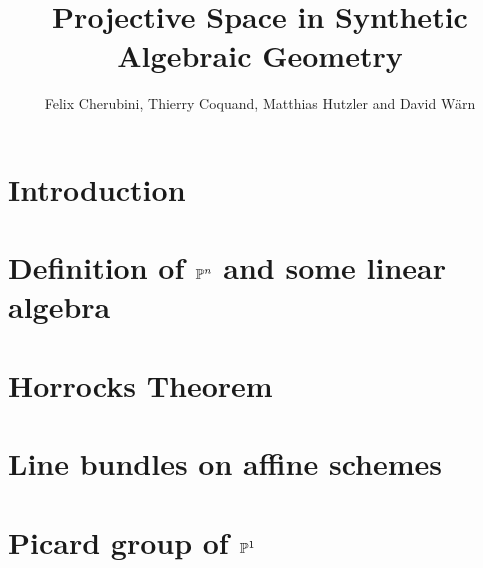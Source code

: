 \documentclass{../util/zariski-small}
\title{Projective Space in Synthetic Algebraic Geometry}
\begin{document}
\author{Felix Cherubini, Thierry Coquand, Matthias Hutzler and David Wärn}

\maketitle




\section*{Introduction}


\section[Definition of projective space and some linear algebra]{Definition of $\mathbb{P}^n$ and some linear algebra}


\section{Horrocks Theorem}


\section{Line bundles on affine schemes}


\section[Picard group of projective space]{Picard group of $\mathbb{P}^1$}


\newpage



\printindex

\printbibliography
\end{document}
